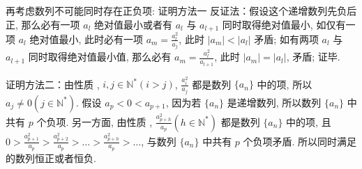 \begin{solutions}
再考虑数列不可能同时存在正负项:
证明方法一 反证法：假设这个递增数列先负后正,
那么必有一项 $a_l$ 绝对值最小或者有 $a_l$ 与 $a_{l+1}$ 同时取得绝对值最小,
如仅有一项 $a_l$ 绝对值最小, 此时必有一项 $\displaystyle a_m = \frac{a_l^2}{a_j}$, 此时 $|a_m| < |a_l|$ 矛盾;
如有两项 $a_l$ 与 $a_{l+1}$ 同时取得绝对值最小值, 那么必有 $\displaystyle a_m = \frac{a_l^2}{a_{l+1}}$, 此时 $|a_m| = |a_l|$, 矛盾;
证毕.

证明方法二：由性质 , $i, j \in \mathbb{N}^* (i > j)$, $\displaystyle \frac{a_i^2}{a_j}$ 都是数列 $\{a_n\}$ 中的项, 所以 $a_j \neq 0 (j \in \mathbb{N}^*)$.
假设 $a_p < 0 < a_{p+1}$, 因为若 $\{a_n\}$ 是递增数列, 所以数列 $\{a_n\}$ 中共有 $p$ 个负项.
另一方面, 由性质 , $\displaystyle \frac{a_{p+h}^2}{a_p} (h \in \mathbb{N}^*)$ 都是数列 $\{a_n\}$ 中的项,
且 $\displaystyle 0 > \frac{a_{p+1}^2}{a_p} > \frac{a_{p+2}^2}{a_p} > \dots > \frac{a_{p+h}^2}{a_p} > \dots$, 与数列 $\{a_n\}$ 中共有 $p$ 个负项矛盾.
所以同时满足的数列恒正或者恒负.
\end{solutions}